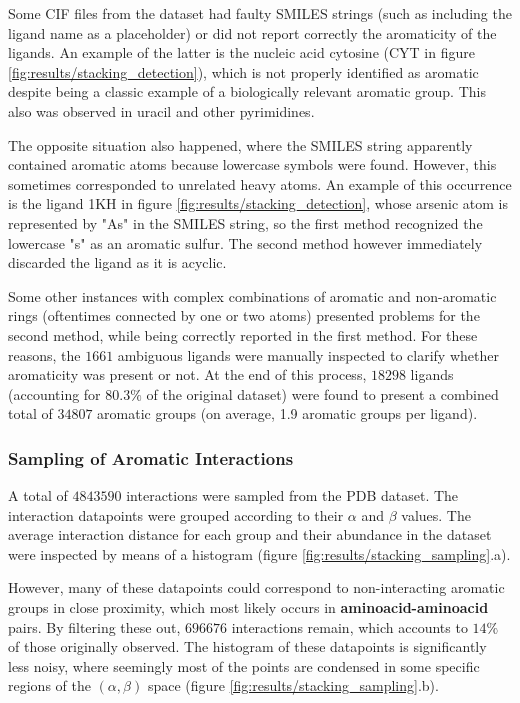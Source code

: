       Some CIF files from the dataset had faulty SMILES strings (such as including the ligand name as a placeholder) or did not report correctly the aromaticity of the ligands. An example of the latter is the nucleic acid cytosine (CYT in figure \ref{fig:results/stacking_detection}), which is not properly identified as aromatic despite being a classic example of a biologically relevant aromatic group. This also was observed in uracil and other pyrimidines.

      The opposite situation also happened, where the SMILES string apparently contained aromatic atoms because lowercase symbols were found. However, this sometimes corresponded to unrelated heavy atoms. An example of this occurrence is the ligand 1KH in figure \ref{fig:results/stacking_detection}, whose arsenic atom is represented by "As" in the SMILES string, so the first method recognized the lowercase "s" as an aromatic sulfur. The second method however immediately discarded the ligand as it is acyclic.

      Some other instances with complex combinations of aromatic and non-aromatic rings (oftentimes connected by one or two atoms) presented problems for the second method, while being correctly reported in the first method. For these reasons, the $1661$ ambiguous ligands were manually inspected to clarify whether aromaticity was present or not. At the end of this process, $18298$ ligands (accounting for $80.3 \% $ of the original dataset) were found to present a combined total of $34807$ aromatic groups (on average, 1.9 aromatic groups per ligand).

    \subsubsection{Sampling of Aromatic Interactions}
      A total of $4843590$ interactions were sampled from the PDB dataset. The interaction datapoints were grouped according to their $\alpha$ and $\beta$ values. The average interaction distance for each group and their abundance in the dataset were inspected by means of a histogram (figure \ref{fig:results/stacking_sampling}.a).

      However, many of these datapoints could correspond to non-interacting aromatic groups in close proximity, which most likely occurs in \textbf{aminoacid-aminoacid} pairs. By filtering these out, $696676$ interactions remain, which accounts to $14 \%$ of those originally observed. The histogram of these datapoints is significantly less noisy, where seemingly most of the points are condensed in some specific regions of the $(\alpha, \beta)$ space (figure \ref{fig:results/stacking_sampling}.b).

